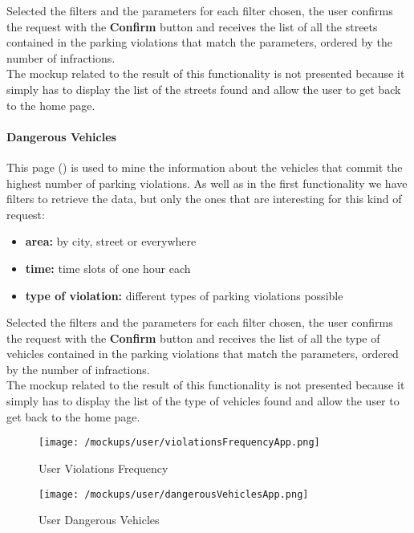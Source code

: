 			Selected the filters and the parameters for each filter chosen, the user confirms the request with the \textbf{Confirm} button and receives the list of all the streets contained in the parking violations that match the parameters, ordered by the number of infractions.\\
			
			The mockup related to the result of this functionality is not presented because it simply has to display the list of the streets found and allow the user to get back to the home page.
			
			\paragraph{Dangerous Vehicles}
			This page () is used to mine the information about the vehicles that commit the highest number of parking violations. As well as in the first functionality we have filters to retrieve the data, but only the ones that are interesting for this kind of request:
			
			\begin{itemize}
				\item \textbf{area:} by city, street or everywhere
				\item \textbf{time:} time slots of one hour each
				\item \textbf{type of violation:} different types of parking violations possible
			\end{itemize}
		
			Selected the filters and the parameters for each filter chosen, the user confirms the request with the \textbf{Confirm} button and receives the list of all the type of vehicles contained in the parking violations that match the parameters, ordered by the number of infractions.\\
			
			The mockup related to the result of this functionality is not presented because it simply has to display the list of the type of vehicles found and allow the user to get back to the home page.
			
			\vspace{0.6cm}
			
			\begin{figure}[ht!]
				\centering
				\begin{minipage}{0.5\textwidth}
					\centering
					\texttt{[image: /mockups/user/violationsFrequencyApp.png]}
					\caption{\label{fig:violationsFrequencyApp} User Violations Frequency}
				\end{minipage}\hfill
				\begin{minipage}{0.5\textwidth}
					\centering
					\texttt{[image: /mockups/user/dangerousVehiclesApp.png]}
					\caption{\label{fig:dangerousVechiclesApp} User Dangerous Vehicles}
				\end{minipage}
			\end{figure}
		
